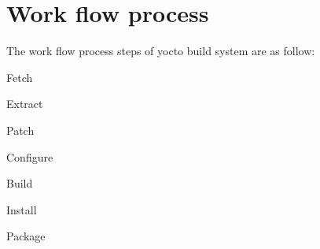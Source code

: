 \section*{Work flow process}


\begin{DoxyItemize}
\item The work flow process steps of yocto build system are as follow\+:
\begin{DoxyEnumerate}
\item Fetch
\item Extract
\item Patch
\item Configure
\item Build
\item Install
\item Package ~\newline
 

\end{DoxyEnumerate}
\end{DoxyItemize}
